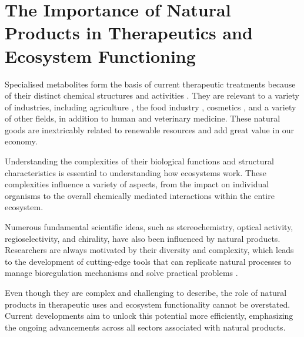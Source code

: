 \documentclass[
11pt, %
oneside, %
english, %
singlespacing, %
headsepline, %
chapterinoneline, %
]{MastersDoctoralThesis} %
\begin{document}
\section{The Importance of Natural Products in Therapeutics and Ecosystem Functioning}
Specialised metabolites form the basis of current therapeutic treatments because of their distinct chemical structures and activities \cite{harveyReemergenceNaturalProducts2015}. They are relevant to a variety of industries, including agriculture \cite{yanImpactProspectNatural2018}, the food industry \cite{gonzalez-manzanoApplicationsNaturalProducts2021}, cosmetics \cite{liuNaturalProductsCosmetics2022}, and a variety of other fields, in addition to human and veterinary medicine. These natural goods are inextricably related to renewable resources and add great value in our economy.

Understanding the complexities of their biological functions and structural characteristics is essential to understanding how ecosystems work. These complexities influence a variety of aspects, from the impact on individual organisms to the overall chemically mediated interactions within the entire ecosystem.

Numerous fundamental scientific ideas, such as stereochemistry, optical activity, regioselectivity, and chirality, have also been influenced by natural products. Researchers are always motivated by their diversity and complexity, which leads to the development of cutting-edge tools that can replicate natural processes to manage bioregulation mechanisms and solve practical problems  \cite{drasarGrowingImportanceNatural2019}.

Even though they are complex and challenging to describe, the role of natural products in therapeutic uses and ecosystem functionality cannot be overstated. Current developments aim to unlock this potential more efficiently, emphasizing the ongoing advancements across all sectors associated with natural products.
\end{document}
